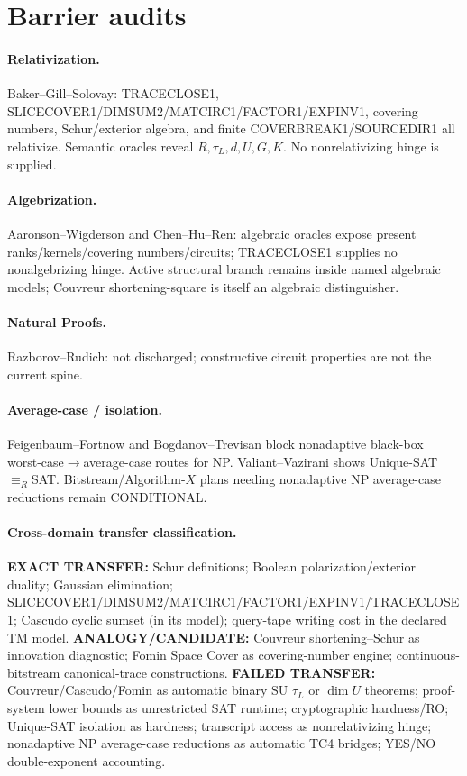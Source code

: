 \documentclass[11pt]{article}
\begin{document}
\section*{Barrier audits}
\paragraph{Relativization.}
Baker--Gill--Solovay: TRACECLOSE1, SLICECOVER1/DIMSUM2/MATCIRC1/FACTOR1/EXPINV1, covering
numbers, Schur/exterior algebra, and finite COVERBREAK1/SOURCEDIR1 all relativize. Semantic
oracles reveal $R,\tau_L,d,U,G,K$. No nonrelativizing hinge is supplied.
\paragraph{Algebrization.}
Aaronson--Wigderson and Chen--Hu--Ren: algebraic oracles expose present ranks/kernels/covering
numbers/circuits; TRACECLOSE1 supplies no nonalgebrizing hinge. Active structural branch remains
inside named algebraic models; Couvreur shortening-square is itself an algebraic distinguisher.
\paragraph{Natural Proofs.}
Razborov--Rudich: not discharged; constructive circuit properties are not the current spine.
\paragraph{Average-case / isolation.}
Feigenbaum--Fortnow and Bogdanov--Trevisan block nonadaptive black-box worst-case$\to$average-case
routes for NP. Valiant--Vazirani shows Unique-SAT$\equiv_R$SAT. Bitstream/Algorithm-$X$ plans
needing nonadaptive NP average-case reductions remain CONDITIONAL.
\paragraph{Cross-domain transfer classification.}
\textbf{EXACT TRANSFER:} Schur definitions; Boolean polarization/exterior duality; Gaussian
elimination; SLICECOVER1/DIMSUM2/MATCIRC1/FACTOR1/EXPINV1/TRACECLOSE1; Cascudo cyclic sumset
(in its model); query-tape writing cost in the declared TM model.
\textbf{ANALOGY/CANDIDATE:} Couvreur shortening--Schur as innovation diagnostic; Fomin Space Cover
as covering-number engine; continuous-bitstream canonical-trace constructions.
\textbf{FAILED TRANSFER:} Couvreur/Cascudo/Fomin as automatic binary SU $\tau_L$ or $\dim U$
theorems; proof-system lower bounds as unrestricted SAT runtime; cryptographic hardness/RO;
Unique-SAT isolation as hardness; transcript access as nonrelativizing hinge; nonadaptive NP
average-case reductions as automatic TC4 bridges; YES/NO double-exponent accounting.
\end{document}
